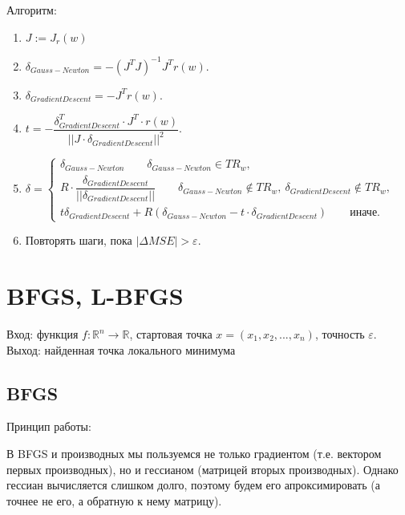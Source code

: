 \documentclass[a4paper,14pt,oneside,openany]{memoir}
\begin{document}
Алгоритм:
\begin{enumerate}
	\item $J := J_r(w)$
	\item $\delta_{Gauss-Newton} = -(J^TJ)^{-1}J^Tr(w)$.
	\item $\delta_{Gradient Descent} = -J^Tr(w)$.
	\item $t = -\dfrac{\delta_{Gradient Descent}^T\cdot J^T \cdot r(w)}{||J\cdot\delta_{Gradient Descent}||^2}$.
	\item $\delta = \begin{cases}
		\delta_{Gauss-Newton}\quad\quad \delta_{Gauss-Newton} \in TR_w, \\
		R\cdot\dfrac{\delta_{Gradient Descent}}{||\delta_{Gradient Descent}||} \quad\quad \delta_{Gauss-Newton} \not\in TR_w,\ \delta_{Gradient Descent}\not\in TR_w, \\
		t\delta_{Gradient Descent} + R(\delta_{Gauss-Newton} - t\cdot \delta_{Gradient Descent}) \quad\quad \text{иначе}.
	\end{cases}$
	\item Повторять шаги, пока $|\Delta MSE| > \varepsilon$.
\end{enumerate}

\section{BFGS, L-BFGS}

Вход: функция $f:\mathbb{R}^n \rightarrow \mathbb{R}$, стартовая точка $x = (x_1,x_2,...,x_n)$, точность $\varepsilon$. \\
Выход: найденная точка локального минимума
\subsection {BFGS}

Принцип работы: 

В BFGS и производных мы пользуемся не только градиентом (т.е. вектором первых производных), но и гессианом (матрицей вторых производных). Однако гессиан вычисляется слишком долго, поэтому будем его апроксимировать (а точнее не его, а обратную к нему матрицу). 
\end{document}
